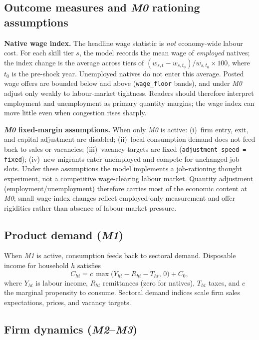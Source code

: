 \documentclass[11pt,a4paper]{article}
\begin{document}
\subsection{Outcome measures and \emph{M0} rationing assumptions}
\label{sec:outcomes}

\textbf{Native wage index.}
The headline wage statistic is \emph{not} economy-wide labour cost.
For each skill tier $s$, the model records the mean wage of \emph{employed} natives; the index change is the average across tiers of $(w_{s,t}-w_{s,t_0})/w_{s,t_0}\times 100$, where $t_0$ is the pre-shock year.
Unemployed natives do not enter this average.
Posted wage offers are bounded below and above (\texttt{wage\_floor} bands), and under \emph{M0} adjust only weakly to labour-market tightness.
Readers should therefore interpret employment and unemployment as primary quantity margins; the wage index can move little even when congestion rises sharply.

\textbf{\emph{M0} fixed-margin assumptions.}
When only \emph{M0} is active: (i)~firm entry, exit, and capital adjustment are disabled; (ii)~local consumption demand does not feed back to sales or vacancies; (iii)~vacancy targets are fixed (\texttt{adjustment\_speed = fixed}); (iv)~new migrants enter unemployed and compete for unchanged job slots.
Under these assumptions the model implements a job-rationing thought experiment, not a competitive wage-clearing labour market.
Quantity adjustment (employment/unemployment) therefore carries most of the economic content at \emph{M0}; small wage-index changes reflect employed-only measurement and offer rigidities rather than absence of labour-market pressure.

\subsection{Product demand (\emph{M1})}

When \emph{M1} is active, consumption feeds back to sectoral demand.
Disposable income for household $h$ satisfies
\begin{equation}
  \label{eq:consumption}
  C_{ht} = c\,\max\!\bigl(Y_{ht} - R_{ht} - T_{ht},\, 0\bigr) + C_0,
\end{equation}
where $Y_{ht}$ is labour income, $R_{ht}$ remittances (zero for natives), $T_{ht}$ taxes, and $c$ the marginal propensity to consume.
Sectoral demand indices scale firm sales expectations, prices, and vacancy targets.

\subsection{Firm dynamics (\emph{M2}--\emph{M3})}
\end{document}
